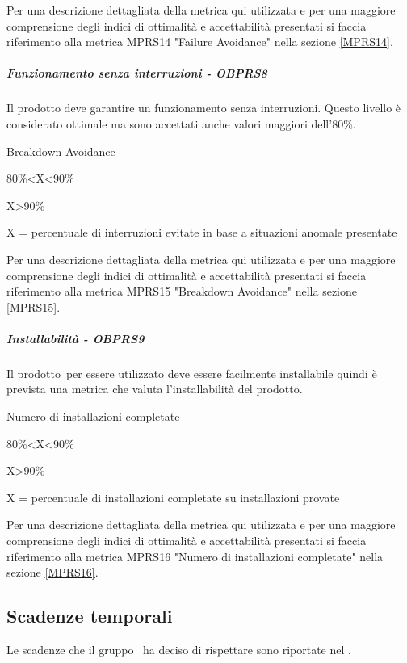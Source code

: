 \documentclass[../PianoDiQualifica.tex]{subfiles}
\begin{document}
					Per una descrizione dettagliata della metrica qui utilizzata e per una maggiore comprensione degli indici di ottimalità e accettabilità presentati si faccia riferimento alla metrica MPRS14 "Failure Avoidance" nella sezione \ref{MPRS14}.
				\subparagraph{Funzionamento senza interruzioni - OBPRS8}
					Il prodotto deve garantire un funzionamento senza interruzioni. Questo livello è considerato ottimale ma sono accettati anche valori maggiori dell'80\%.  
					\begin{description}
						\item [Metrica utilizzata:] Breakdown Avoidance
						\item [Soglia di accettabilità:] 80\%<X<90\%
						\item [Soglia di ottimalità:] X>90\%
						\item X = percentuale di interruzioni evitate in base a situazioni anomale presentate
					\end{description}
					Per una descrizione dettagliata della metrica qui utilizzata e per una maggiore comprensione degli indici di ottimalità e accettabilità presentati si faccia riferimento alla metrica MPRS15 "Breakdown Avoidance" nella sezione \ref{MPRS15}.
				\subparagraph{Installabilità - OBPRS9}	
					Il prodotto\g\ per essere utilizzato deve essere facilmente installabile quindi è prevista una metrica che valuta l'installabilità del prodotto.
					\begin{description}
						\item Numero di installazioni completate
						\item [Soglia di accettabilità:] 80\%<X<90\%
						\item [Soglia di ottimalità:] X>90\%
						\item X = percentuale di installazioni completate su installazioni provate 
					\end{description}
					Per una descrizione dettagliata della metrica qui utilizzata e per una maggiore comprensione degli indici di ottimalità e accettabilità presentati si faccia riferimento alla metrica MPRS16 "Numero di installazioni completate" nella sezione \ref{MPRS16}.
	\subsection{Scadenze temporali}
	Le scadenze che il gruppo \leaf\ ha deciso di rispettare sono riportate nel \pianodiprogettov.
\end{document}
